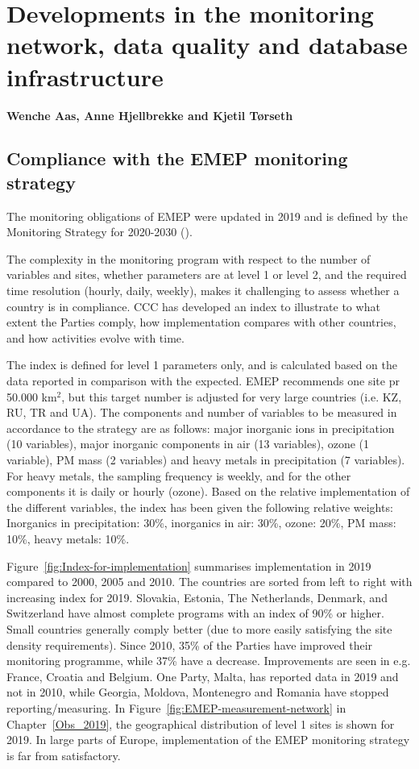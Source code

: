 \chapter[Development of measurements]{Developments in the monitoring network, data quality and database infrastructure}\label{ch:ObsDevel}

{\bf{Wenche Aas, Anne Hjellbrekke and Kjetil T{\o}rseth}}
\vspace{30pt}

\section{\label{sec:Compliance-with-monitoring}Compliance with the EMEP monitoring strategy}

The monitoring obligations of EMEP were updated in 2019 and is defined by the Monitoring Strategy for 2020-2030 (\cite{MonStrat2019}). 

The complexity in the monitoring program with respect to the number of variables and sites, whether parameters are at level 1 or level 2, and the required time resolution (hourly, daily, weekly), makes it challenging to assess whether a country is in compliance. CCC has developed an index to illustrate to what extent the Parties comply, how implementation compares with other countries, and how activities evolve with time.

The index is defined for level 1 parameters only, and is calculated based on the data reported in comparison with the expected. EMEP recommends one site pr 50.000 km$^{2}$, but this target number is adjusted for very large countries (i.e. KZ, RU, TR and UA). The components and number of variables to be measured in accordance to the strategy are as follows: major inorganic ions in precipitation (10 variables), major inorganic components in air (13 variables), ozone (1 variable), PM mass (2 variables) and heavy metals in precipitation (7 variables). For heavy metals, the sampling frequency is weekly, and for the other components it is daily or hourly (ozone). Based on the relative implementation of the different variables, the index has been given the following relative weights: Inorganics in precipitation: 30\%, inorganics in air: 30\%, ozone: 20\%, PM mass: 10\%, heavy metals: 10\%.

Figure~\ref{fig:Index-for-implementation} summarises implementation in 2019 compared to 2000, 2005 and 2010. The countries are sorted from left to right with increasing index for 2019. Slovakia,  Estonia, The Netherlands, Denmark, and Switzerland have almost complete programs with an index of 90\% or higher. Small countries generally comply better (due to more easily satisfying the site density requirements). Since 2010, 35\% of the Parties have improved their monitoring programme,  while 37\% have a decrease. Improvements are seen in e.g. France, Croatia and Belgium.  One Party, Malta, has reported data in 2019 and not in 2010, while Georgia, Moldova, Montenegro and Romania have stopped reporting/measuring. In Figure~\ref{fig:EMEP-measurement-network} in Chapter~\ref{Obs_2019}, the geographical distribution of level 1 sites is shown for 2019.  
In large parts of Europe, implementation of the EMEP monitoring strategy is far from satisfactory. 

